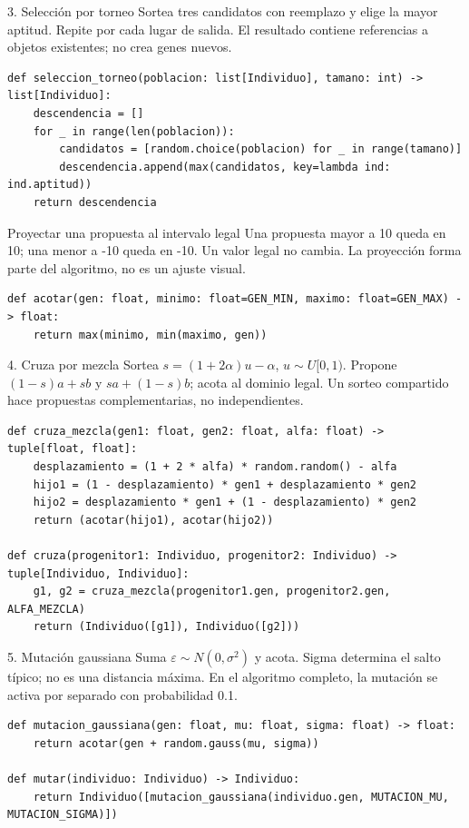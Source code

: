 \begin{frame}[fragile]{3. Selección por torneo}
Sortea tres candidatos con reemplazo y elige la mayor aptitud. Repite por cada lugar de salida. El resultado contiene referencias a objetos existentes; no crea genes nuevos.

\begin{lstlisting}
def seleccion_torneo(poblacion: list[Individuo], tamano: int) -> list[Individuo]:
    descendencia = []
    for _ in range(len(poblacion)):
        candidatos = [random.choice(poblacion) for _ in range(tamano)]
        descendencia.append(max(candidatos, key=lambda ind: ind.aptitud))
    return descendencia
\end{lstlisting}
\end{frame}
\begin{frame}[fragile]{Proyectar una propuesta al intervalo legal}
Una propuesta mayor a 10 queda en 10; una menor a -10 queda en -10. Un valor legal no cambia. La proyección forma parte del algoritmo, no es un ajuste visual.

\begin{lstlisting}
def acotar(gen: float, minimo: float=GEN_MIN, maximo: float=GEN_MAX) -> float:
    return max(minimo, min(maximo, gen))
\end{lstlisting}
\end{frame}
\begin{frame}[fragile]{4. Cruza por mezcla}
Sortea $s=(1+2\alpha)u-\alpha$, $u\sim U[0,1)$. Propone $(1-s)a+sb$ y $sa+(1-s)b$; acota al dominio legal. Un sorteo compartido hace propuestas complementarias, no independientes.

\begin{lstlisting}
def cruza_mezcla(gen1: float, gen2: float, alfa: float) -> tuple[float, float]:
    desplazamiento = (1 + 2 * alfa) * random.random() - alfa
    hijo1 = (1 - desplazamiento) * gen1 + desplazamiento * gen2
    hijo2 = desplazamiento * gen1 + (1 - desplazamiento) * gen2
    return (acotar(hijo1), acotar(hijo2))

def cruza(progenitor1: Individuo, progenitor2: Individuo) -> tuple[Individuo, Individuo]:
    g1, g2 = cruza_mezcla(progenitor1.gen, progenitor2.gen, ALFA_MEZCLA)
    return (Individuo([g1]), Individuo([g2]))
\end{lstlisting}
\end{frame}
\begin{frame}[fragile]{5. Mutación gaussiana}
Suma $\varepsilon\sim N(0,\sigma^2)$ y acota. Sigma determina el salto típico; no es una distancia máxima. En el algoritmo completo, la mutación se activa por separado con probabilidad 0.1.

\begin{lstlisting}
def mutacion_gaussiana(gen: float, mu: float, sigma: float) -> float:
    return acotar(gen + random.gauss(mu, sigma))

def mutar(individuo: Individuo) -> Individuo:
    return Individuo([mutacion_gaussiana(individuo.gen, MUTACION_MU, MUTACION_SIGMA)])
\end{lstlisting}
\end{frame}
